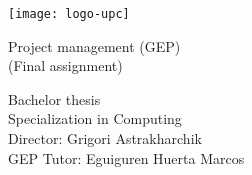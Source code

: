 
\thispagestyle{empty}
\clearpage
\setcounter{page}{-1}

\makeatletter
\begin{titlepage}
{
    \centering
    \texttt{[image: logo-upc]}
    \null
    \vspace{3em}
    {\Huge \bfseries \@title \par}
    \vspace{2em}
    {\large Project management (GEP) \\
        (Final assignment) %
    \par}
    \vspace{3em}
    {\large \scshape \@date \par}

    \vfill
    {\raggedleft \large \bfseries \@author \par}
    \vspace{1em}
    {\raggedleft \large
        Bachelor thesis \\
        Specialization in Computing \\
        \vspace{2em}
        Director: Grigori Astrakharchik \\
        GEP Tutor: Eguiguren Huerta Marcos
    \par}
}
\end{titlepage}
\makeatother
